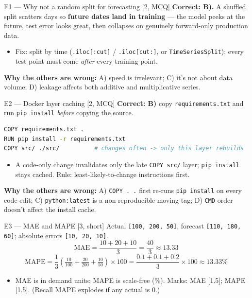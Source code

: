 \documentclass[aspectratio=169,11pt]{beamer}
\begin{document}
\begin{frame}{E1 --- Why not a random split for forecasting \hfill [2, MCQ]}
\textbf{Correct: B).} A shuffled split scatters days so \textbf{future dates land in training} --- the model peeks at the future, test error looks great, then collapses on genuinely forward-only production data.
\begin{itemize}
  \item Fix: split by time (\texttt{.iloc[:cut]} / \texttt{.iloc[cut:]}, or \texttt{TimeSeriesSplit}); every test point must come \emph{after} every training point.
\end{itemize}
\textbf{Why the others are wrong:} A) speed is irrelevant; C) it's not about data volume; D) leakage affects both additive and multiplicative series.
\end{frame}

\begin{frame}[fragile]{E2 --- Docker layer caching \hfill [2, MCQ]}
\textbf{Correct: B)} copy \texttt{requirements.txt} and run \texttt{pip install} \emph{before} copying the source.
\begin{lstlisting}[language=bash]
COPY requirements.txt .
RUN pip install -r requirements.txt
COPY src/ ./src/          # changes often -> only this layer rebuilds
\end{lstlisting}
\begin{itemize}
  \item A code-only change invalidates only the late \texttt{COPY src/} layer; \texttt{pip install} stays cached. Rule: least-likely-to-change instructions first.
\end{itemize}
\textbf{Why the others are wrong:} A) \texttt{COPY . .} first re-runs \texttt{pip install} on every code edit; C) \texttt{python:latest} is a non-reproducible moving tag; D) \texttt{CMD} order doesn't affect the install cache.
\end{frame}

\begin{frame}[fragile]{E3 --- MAE and MAPE \hfill [3, short]}
Actual \texttt{[100, 200, 50]}, forecast \texttt{[110, 180, 60]}; absolute errors \texttt{[10, 20, 10]}.
\[
\text{MAE} = \frac{10 + 20 + 10}{3} = \frac{40}{3} \approx \boldsymbol{13.33}
\]
\[
\text{MAPE} = \frac{1}{3}\!\left(\tfrac{10}{100} + \tfrac{20}{200} + \tfrac{10}{50}\right)\!\times 100
= \frac{0.1 + 0.1 + 0.2}{3}\times 100 \approx \boldsymbol{13.33\%}
\]
\begin{itemize}
  \item MAE is in demand units; MAPE is scale-free (\%). Marks: MAE [1.5]; MAPE [1.5]. (Recall MAPE explodes if any actual is 0.)
\end{itemize}
\end{frame}
\end{document}
